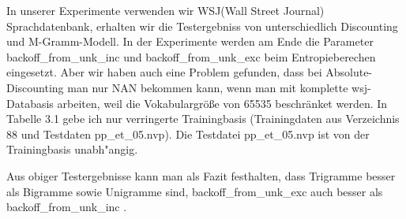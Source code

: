 In unserer Experimente verwenden wir WSJ(Wall Street Journal) Sprachdatenbank, erhalten wir die Testergebniss von unterschiedlich Discounting und M-Gramm-Modell. In der Experimente werden am Ende die Parameter backoff\_from\_unk\_inc und backoff\_from\_unk\_exc beim Entropieberechen eingesetzt.  
 Aber wir haben auch eine Problem gefunden, dass bei Absolute-Discounting man nur NAN bekommen kann, wenn man mit komplette wsj-Databasis arbeiten, weil die Vokabulargr\"o\ss e von 65535 beschr\"anket werden. In Tabelle 3.1 gebe ich nur verringerte Trainingbasis (Trainingdaten aus Verzeichnis 88 und Testdaten pp\_et\_05.nvp). Die Testdatei pp\_et\_05.nvp ist von der Trainingbasis unabh"angig.
 
 
 
 
Aus obiger Testergebnisse kann man als Fazit festhalten, dass Trigramme besser als Bigramme sowie Unigramme sind, backoff\_from\_unk\_exc auch besser als backoff\_from\_unk\_inc .
 